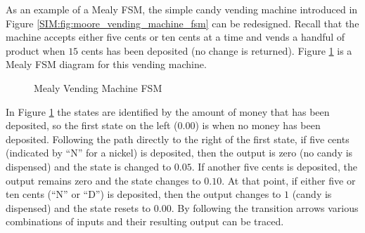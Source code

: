 As an example of a Mealy \ac{FSM}, the simple candy vending machine introduced in Figure \ref{SIM:fig:moore_vending_machine_fsm} can be redesigned. Recall that the machine accepts either five cents or ten cents at a time and vends a handful of product when $ 15 $ cents has been deposited (no change is returned). Figure \ref{SIM:fig:mealy_vending_machine_fsm} is a Mealy \ac{FSM} diagram for this vending machine.

\begin{figure}[H]
  \caption{Mealy Vending Machine FSM}
  \label{SIM:fig:mealy_vending_machine_fsm}
  \myfloatalign
\end{figure}

In Figure \ref{SIM:fig:mealy_vending_machine_fsm} the states are identified by the amount of money that has been deposited, so the first state on the left ($ 0.00 $) is when no money has been deposited. Following the path directly to the right of the first state, if five cents (indicated by ``N'' for a nickel) is deposited, then the output is zero (no candy is dispensed) and the state is changed to $ 0.05 $. If another five cents is deposited, the output remains zero and the state changes to $ 0.10 $. At that point, if either five or ten cents (``N'' or ``D'') is deposited, then the output changes to $ 1 $ (candy is dispensed) and the state resets to $ 0.00 $. By following the transition arrows various combinations of inputs and their resulting output can be traced.

